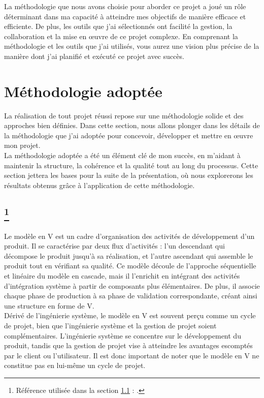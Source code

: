 \documentclass[a4paper, 12pt, french]{article}
\newcommand{\printSectionFootnote}[2]{
	\nameref{#1} \footnote{Référence utilisée dans la section \ref{#1} \nameref{#1} : \cite{#2}.}
}
\begin{document}
			La méthodologie que nous avons choisie pour aborder ce projet a joué un rôle déterminant dans ma capacité à atteindre mes objectifs de manière efficace et efficiente. De plus, les outils que j'ai sélectionnés ont facilité la gestion, la collaboration et la mise en œuvre de ce projet complexe. En comprenant la méthodologie et les outils que j'ai utilisés, vous aurez une vision plus précise de la manière dont j'ai planifié et exécuté ce projet avec succès.

			\section{Méthodologie adoptée}
				La réalisation de tout projet réussi repose sur une méthodologie solide et des approches bien définies. Dans cette section, nous allons plonger dans les détails de la méthodologie que j'ai adoptée pour concevoir, développer et mettre en œuvre mon projet.\\

				La méthodologie adoptée a été un élément clé de mon succès, en m'aidant à maintenir la structure, la cohérence et la qualité tout au long du processus. Cette section jettera les bases pour la suite de la présentation, où nous explorerons les résultats obtenus grâce à l'application de cette méthodologie.
				
				\newpage
				\subsection[Choix de la méthodologie : méthode en V]{\printSectionFootnote{subsection:modele_v}{wikipedia:modele_v}}\label{subsection:modele_v}%
					Le modèle en V est un cadre d'organisation des activités de développement d'un produit. Il se caractérise par deux flux d'activités : l'un descendant qui décompose le produit jusqu'à sa réalisation, et l'autre ascendant qui assemble le produit tout en vérifiant sa qualité. Ce modèle découle de l'approche séquentielle et linéaire du modèle en cascade, mais il l'enrichit en intégrant des activités d'intégration système à partir de composants plus élémentaires. De plus, il associe chaque phase de production à sa phase de validation correspondante, créant ainsi une structure en forme de V.\\

					Dérivé de l'ingénierie système, le modèle en V est souvent perçu comme un cycle de projet, bien que l'ingénierie système et la gestion de projet soient complémentaires. L'ingénierie système se concentre sur le développement du produit, tandis que la gestion de projet vise à atteindre les avantages escomptés par le client ou l'utilisateur. Il est donc important de noter que le modèle en V ne constitue pas en lui-même un cycle de projet.\\
\end{document}
